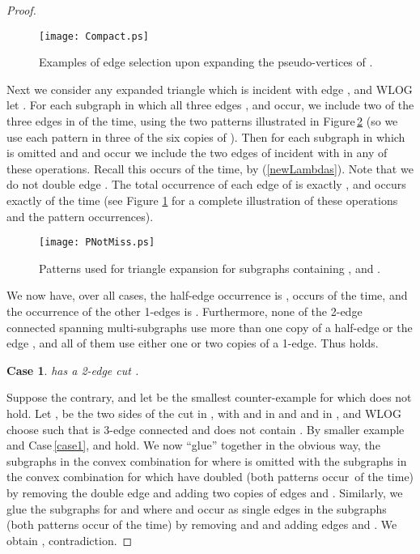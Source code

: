 \documentclass[oneeqnum,final]{siamltex1213}
\newtheorem{case}{Case}
\begin{document}
\begin{proof}
\begin{figure}
\begin{center}
\texttt{[image: Compact.ps]}
\end{center}
\caption{Examples of edge selection upon expanding the pseudo-vertices of .}
\label{ExpandingPseudoVertices}
\end{figure}

Next we consider any expanded triangle  which is incident with edge , and WLOG let . For each subgraph  in which all three edges ,  and   occur, we include two of the three edges in   of the time, using the two patterns illustrated in Figure\,\ref{ExpandingPseudoVerticesPNotMissing} (so we use each pattern in three of the six copies of ). Then for each subgraph  in which  is omitted and  and  occur we include the two edges of  incident with  in any of these operations. Recall this occurs  of the time, by (\ref{newLambdas}). Note that we do not double edge . The total occurrence of each edge of  is exactly , and  occurs exactly  of the time (see Figure \ref{ExpandingPseudoVertices} for a complete illustration of these operations and the pattern occurrences).

\begin{figure}
\begin{center}
\texttt{[image: PNotMiss.ps]}
\end{center}
\caption{Patterns used for triangle expansion for subgraphs containing ,  and .}
\label{ExpandingPseudoVerticesPNotMissing}
\end{figure}

We now have, over all cases, the half-edge occurrence is ,  occurs  of the time, and the occurrence of the other 1-edges is . Furthermore, none of the 2-edge connected spanning multi-subgraphs use more than one copy of a half-edge or the edge , and all of them use either one or two copies of a 1-edge. Thus  holds.

\begin{case}
 has a 2-edge cut .
\end{case}
Suppose the contrary, and let  be the smallest counter-example for which  does not hold. Let ,  be the two sides of the cut  in , with  and  in  and  and  in , and WLOG choose  such that  is 3-edge connected and does not contain . By smaller example and Case\,\ref{case1},  and  hold. We now ``glue'' together in the obvious way, the subgraphs in the convex combination for  where  is omitted with the subgraphs in the convex combination for  which have  doubled (both patterns occur\, of the time) by removing the double edge  and adding two copies of edges  and . Similarly, we glue the subgraphs for  and  where  and  occur as single edges in the subgraphs (both patterns occur  of the time) by removing  and  and adding edges  and . We obtain , contradiction.
\end{proof}
\end{document}

